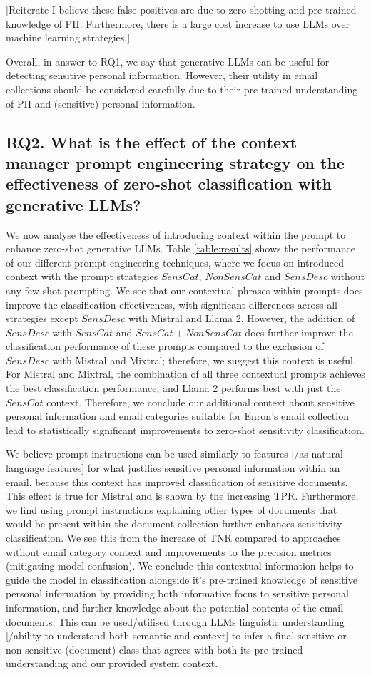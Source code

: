 [Reiterate I believe these false positives are due to zero-shotting and pre-trained knowledge of PII. Furthermore, there is a large cost increase to use LLMs over machine learning strategies.]

Overall, in answer to RQ1, we say that generative LLMs can be useful for detecting sensitive personal information. However, their utility in email collections should be considered carefully due to their pre-trained understanding of PII and (sensitive) personal information.

\subsection{RQ2. What is the effect of the context manager prompt engineering strategy on the effectiveness of zero-shot classification with generative LLMs?}
We now analyse the effectiveness of introducing context within the prompt to enhance zero-shot generative LLMs. Table \ref{table:results} shows the performance of our different prompt engineering techniques, where we focus on introduced context with the prompt strategies $SensCat$, $NonSensCat$ and $SensDesc$ without any few-shot prompting. We see that our contextual phrases within prompts does improve the classification effectiveness, with significant differences across all strategies except $SensDesc$ with Mistral and Llama 2. However, the addition of $SensDesc$ with $SensCat$ and $SensCat+NonSensCat$ does further improve the classification performance of these prompts compared to the exclusion of $SensDesc$ with Mistral and Mixtral; therefore, we suggest this context is useful. For Mistral and Mixtral, the combination of all three contextual prompts achieves the best classification performance, and Llama 2 performs best with just the $SensCat$ context. Therefore, we conclude our additional context about sensitive personal information and email categories suitable for Enron's email collection lead to statistically significant improvements to zero-shot sensitivity classification. 

We believe prompt instructions can be used similarly to features [/as natural language features] for what justifies sensitive personal information within an email, because this context has improved classification of sensitive documents. This effect is true for Mistral and is shown by the increasing TPR. Furthermore, we find using prompt instructions explaining other types of documents that would be present within the document collection further enhances sensitivity classification. We see this from the increase of TNR compared to approaches without email category context and improvements to the precision metrics (mitigating model confusion). We conclude this contextual information helps to guide the model in classification alongside it’s pre-trained knowledge of sensitive personal information by providing both informative focus to sensitive personal information, and further knowledge about the potential contents of the email documents. This can be used/utilised through LLMs linguistic understanding [/ability to understand both semantic and context] to infer a final sensitive or non-sensitive (document) class that agrees with both its pre-trained understanding and our provided system context. 

